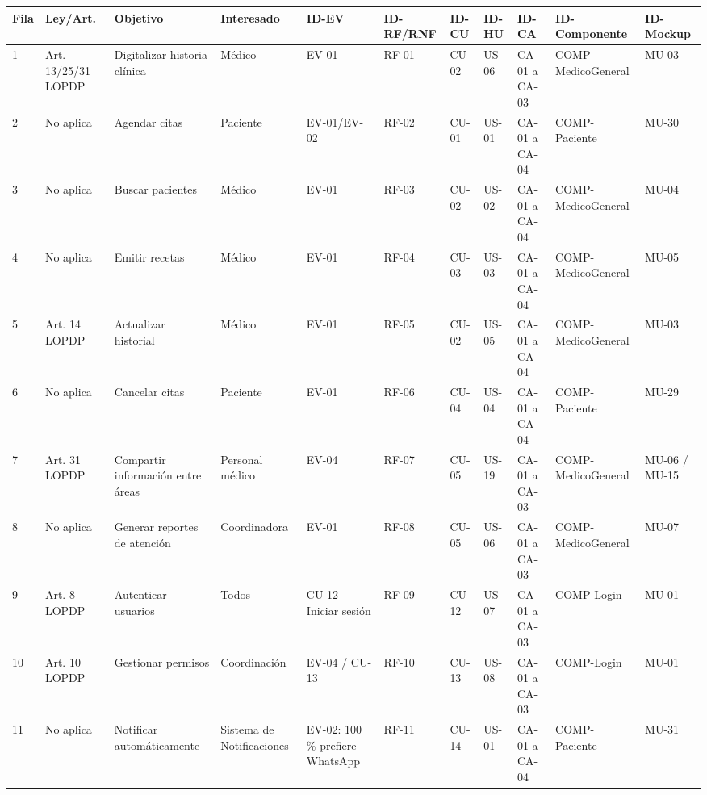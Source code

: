 \documentclass[11pt,a4paper]{article}
\begin{document}
	\begin{longtable}{p{} p{} p{} p{} p{} p{} p{} p{} p{} p{} p{}}
		
		\toprule
		\textbf{Fila} & \textbf{Ley/Art.} & \textbf{Objetivo} & \textbf{Interesado} & \textbf{ID-EV} & \textbf{ID-RF/RNF} & \textbf{ID-CU} & \textbf{ID-HU} & \textbf{ID-CA} & \textbf{ID-Componente} & \textbf{ID-Mockup} \\
		
		\midrule
		\endhead
		
		
		1 & Art. 13/25/31 LOPDP & Digitalizar historia clínica & Médico & EV-01 & RF-01 & CU-02 & US-06 & CA-01 a CA-03 & COMP-MedicoGeneral & MU-03 \\
		2 & No aplica & Agendar citas & Paciente & EV-01/EV-02 & RF-02 & CU-01 & US-01 & CA-01 a CA-04 & COMP-Paciente & MU-30 \\
		3 & No aplica & Buscar pacientes & Médico & EV-01 & RF-03 & CU-02 & US-02 & CA-01 a CA-04 & COMP-MedicoGeneral & MU-04 \\
		4 & No aplica & Emitir recetas & Médico & EV-01 & RF-04 & CU-03 & US-03 & CA-01 a CA-04 & COMP-MedicoGeneral & MU-05 \\
		5 & Art. 14 LOPDP & Actualizar historial & Médico & EV-01 & RF-05 & CU-02 & US-05 & CA-01 a CA-04 & COMP-MedicoGeneral & MU-03 \\
		6 & No aplica & Cancelar citas & Paciente & EV-01 & RF-06 & CU-04 & US-04 & CA-01 a CA-04 & COMP-Paciente & MU-29  \\
		7 & Art. 31 LOPDP & Compartir información entre áreas & Personal médico & EV-04 & RF-07 & CU-05 & US-19 & CA-01 a CA-03 & COMP-MedicoGeneral & MU-06 / MU-15 \\
		8 & No aplica & Generar reportes de atención & Coordinadora & EV-01 & RF-08 & CU-05 & US-06 & CA-01 a CA-03 & COMP-MedicoGeneral & MU-07 \\
		9 & Art. 8 LOPDP & Autenticar usuarios & Todos & CU-12 Iniciar sesión & RF-09 & CU-12 & US-07 & CA-01 a CA-03 & COMP-Login & MU-01 \\
		10 & Art. 10 LOPDP & Gestionar permisos & Coordinación & EV-04 / CU-13 & RF-10 & CU-13 & US-08 & CA-01 a CA-03 & COMP-Login & MU-01 \\
		11 & No aplica & Notificar automáticamente & Sistema de Notificaciones & EV-02: 100\,\% prefiere WhatsApp & RF-11 & CU-14 & US-01 & CA-01 a CA-04 & COMP-Paciente & MU-31  \\

\end{longtable}
\end{document}
